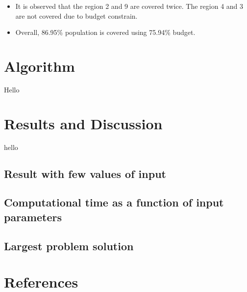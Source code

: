 \documentclass[preprint,12pt]{elsarticle}
\begin{document}
\begin{itemize}
	\item It is observed that the region 2 and 9 are covered twice. The region 4 and 3 are not covered due to budget constrain.
	
	\item Overall, 86.95\% population is covered using 75.94\% budget.
	 

	
	
	
	
	
	
	
\end{itemize}


\section{Algorithm}
Hello





\section{Results and Discussion}
hello
\subsection{Result with few values of input}

\subsection{Computational time as a function of input parameters}
\subsection{Largest problem solution}









	\newpage
	
\section{References}
	
	
	
						
	
	
	
	
	
\end{document}
